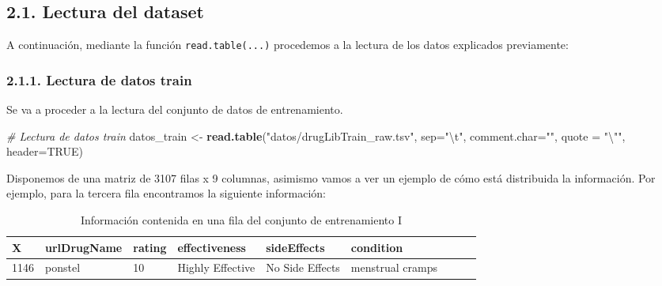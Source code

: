 \documentclass[spanish,]{article}
\newenvironment{Shaded}{\begin{snugshade}}{\end{snugshade}}
\newcommand{\KeywordTok}[1]{\textcolor[rgb]{0.13,0.29,0.53}{\textbf{#1}}}
\newcommand{\DataTypeTok}[1]{\textcolor[rgb]{0.13,0.29,0.53}{#1}}
\newcommand{\CharTok}[1]{\textcolor[rgb]{0.31,0.60,0.02}{#1}}
\newcommand{\StringTok}[1]{\textcolor[rgb]{0.31,0.60,0.02}{#1}}
\newcommand{\CommentTok}[1]{\textcolor[rgb]{0.56,0.35,0.01}{\textit{#1}}}
\newcommand{\OtherTok}[1]{\textcolor[rgb]{0.56,0.35,0.01}{#1}}
\newcommand{\NormalTok}[1]{#1}
\begin{document}
\newpage 

\subsection{2.1. Lectura del dataset}\label{lectura-del-dataset}

A continuación, mediante la función \texttt{read.table(...)} procedemos
a la lectura de los datos explicados previamente:

\subsubsection{2.1.1. Lectura de datos
train}\label{lectura-de-datos-train}

Se va a proceder a la lectura del conjunto de datos de entrenamiento.

\begin{Shaded}
\begin{Highlighting}[]
\CommentTok{# Lectura de datos train}
\NormalTok{datos_train <-}\StringTok{ }\KeywordTok{read.table}\NormalTok{(}\StringTok{"datos/drugLibTrain_raw.tsv"}\NormalTok{, }\DataTypeTok{sep=}\StringTok{"}\CharTok{\textbackslash{}t}\StringTok{"}\NormalTok{, }\DataTypeTok{comment.char=}\StringTok{""}\NormalTok{,}
                          \DataTypeTok{quote =} \StringTok{"}\CharTok{\textbackslash{}"}\StringTok{"}\NormalTok{, }\DataTypeTok{header=}\OtherTok{TRUE}\NormalTok{)}
\end{Highlighting}
\end{Shaded}

Disponemos de una matriz de 3107 filas x 9 columnas, asimismo vamos a
ver un ejemplo de cómo está distribuida la información. Por ejemplo,
para la tercera fila encontramos la siguiente información:

\begin{table}[h]
  \centering
    \begin{tabular}{|l|l|l|l|l|l|l|l|l|}
      \hline
      \rowcolor[rgb]{0.94,0.97,1.0} \textbf{X} & \textbf{urlDrugName} & \textbf{rating} & \textbf{effectiveness} 
      & \textbf{sideEffects} &\textbf{condition} \\ \hline
      1146 & ponstel & 10 & Highly Effective & No Side Effects & menstrual cramps  \\ \hline
    \end{tabular}
  \caption{Información contenida en una fila del conjunto de entrenamiento I}
  \label{tabla:datos_trainI}
\end{table}
\end{document}
